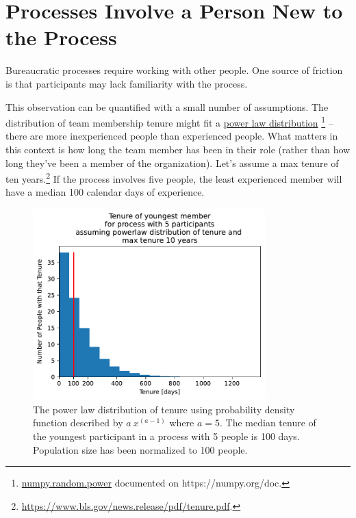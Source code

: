 \section{Processes Involve a Person New to the Process}



Bureaucratic processes require working with other people. One source of friction is that participants may lack familiarity with the process. 

This observation can be quantified with a small number of assumptions. The distribution of team membership tenure might fit a \href{https://en.wikipedia.org/wiki/Power_law}{power law distribution}
\footnote{\href{https://numpy.org/doc/stable/reference/random/generated/numpy.random.power.html}{numpy.random.power} documented on https://numpy.org/doc.}
-- there are more inexperienced people than experienced people. What matters in this context is how long the team member has been in their role (rather than how long they've been a member of the organization). Let's assume a max tenure of ten years.\footnote{\href{https://www.bls.gov/news.release/pdf/tenure.pdf}{https://www.bls.gov/news.release/pdf/tenure.pdf}.} If the process involves five people, the least experienced member will have a median 100 calendar days of experience.

\begin{figure}[!htb] %
    \centering
    \includegraphics[width=0.8\textwidth]{images/tenure_power_distribution_a5_with_max_tenure10_and_5_participants.pdf}
    \caption{The power law distribution of tenure using probability density function described by $a\ x^{(a-1)}$ where $a=5$. The median tenure of the youngest participant  in a process with 5 people is 100 days. Population size has been normalized to 100 people.}
    \label{fig:tenure-powerlaw-5-participants-tenure10}
\end{figure}


